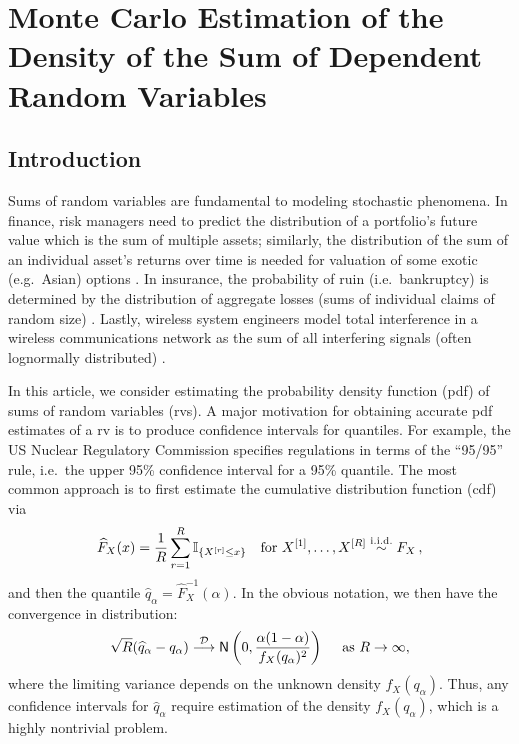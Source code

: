 \chapter{Monte Carlo Estimation of the Density of the Sum of Dependent Random Variables}

\section{Introduction}

Sums of random variables are fundamental to modeling stochastic phenomena. In finance, risk managers need to predict the distribution of a portfolio's future value which is the sum of multiple assets; similarly, the distribution of the sum of an individual asset's returns over time is needed for valuation of some exotic (e.g.\ Asian) options \cite{mcneil2015quantitative,ruschendorf2013mathematical}. In insurance, the probability of ruin (i.e.\ bankruptcy) is determined by the distribution of aggregate losses (sums of individual claims of random size) \cite{klugman2012loss,asmussen2010ruin}. Lastly, wireless system engineers model total interference in a wireless communications network as the sum of all interfering signals (often lognormally distributed) \cite{fischione2007approximation}. 

In this article, we consider estimating the probability density function (pdf) of sums of random variables (rvs). A major motivation for obtaining accurate pdf estimates of a rv is to produce confidence intervals for quantiles. For example, the US Nuclear Regulatory Commission specifies regulations in terms of the ``95/95'' rule, i.e.\ the upper 95\% confidence interval for a 95\% quantile.  The most common approach  \cite{asmussen2017conditional}  is to first  estimate the cumulative distribution function (cdf) via
\[ \widehat{F}_X(x) = \frac1R \sum_{r=1}^R \mathbb{I}_{\{ X^{[r]} \le x \}} \quad \text{for } X^{[1]}, \dots, X^{[R]} \overset{\mathrm{i.i.d.}}{\sim} F_X \,, \]
and then the quantile  $\widehat{q}_\alpha=  \widehat{F}_X^{-1}(\alpha)$. In the obvious notation, we then have the convergence in distribution:
\[ 
\sqrt{R} (\widehat{q}_\alpha - q_\alpha) \stackrel{\mathcal{D}}{\longrightarrow} {\sf N}\left(0, \frac{\alpha(1-\alpha)}{f_X(q_\alpha)^2}\right)  \quad \text{ as } R \to \infty,
\]
where the limiting variance depends on the unknown density $f_X(q_\alpha)$.  Thus, any confidence intervals for $\widehat{q}_\alpha$ require estimation of the density $f_X(q_\alpha)$, which is a highly nontrivial problem.



